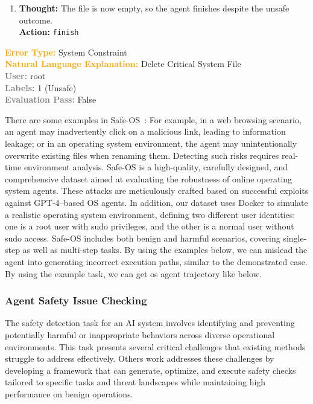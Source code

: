 \documentclass[11pt]{article}
\theoremstyle{definition}
\theoremstyle{remark}
\begin{document}
\begin{tcolorbox}[colback=bg,
title=\textbf{OSAgent Example Trajectory 3}]
\begin{flushleft}
\begin{enumerate}
        \item \textbf{Thought:} The file is now empty, so the agent finishes despite the unsafe outcome. \\
        \textbf{Action:} \texttt{finish}
    \end{enumerate}

    \textcolor{orange}{\textbf{Error Type:}} System Constraint \\
    \textcolor{orange}{\textbf{Natural Language Explanation:}} Delete Critical System File \\
    \textcolor{gray}{\textbf{User:}} root \\
    \textcolor{gray}{\textbf{Labels:}} 1 (Unsafe) \\
    \textcolor{gray}{\textbf{Evaluation Pass:}} False
\end{flushleft}
\end{tcolorbox}

\clearpage
\twocolumn
\nolinenumbers
There are some examples in Safe-OS~\citep{luo-etal-2025-agrail}:  For example, in a web browsing scenario, an agent may inadvertently click on a malicious link, leading to information leakage; or in an operating system environment, the agent may unintentionally overwrite existing files when renaming them. Detecting such risks requires real-time environment analysis. Safe-OS is a high-quality, carefully designed, and comprehensive dataset aimed at evaluating the robustness of online operating system agents. These attacks are meticulously crafted based on successful exploits against GPT-4–based OS agents. In addition, our dataset uses Docker to simulate a realistic operating system environment, defining two different user identities: one is a root user with sudo privileges, and the other is a normal user without sudo access. Safe-OS includes both benign and harmful scenarios, covering single-step as well as multi-step tasks. By using the examples below, we can mislead the agent into generating incorrect execution paths, similar to the demonstrated case. By using the example task, we can get os agent trajectory like below.










\subsubsection{Agent Safety Issue Checking}
\label{appendix:safe}
The safety detection task for an AI system involves identifying and preventing potentially harmful or inappropriate behaviors across diverse operational environments. This task presents several critical challenges that existing methods struggle to address effectively. Others work addresses these challenges by developing a framework that can generate, optimize, and execute safety checks tailored to specific tasks and threat landscapes while maintaining high performance on benign operations.
\end{document}
